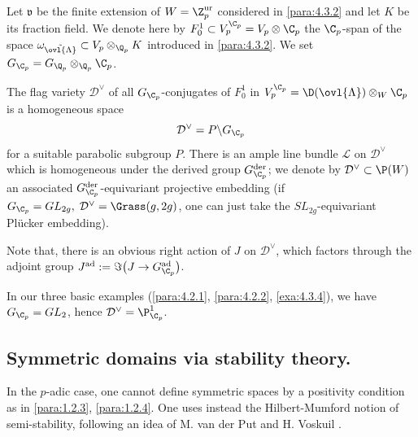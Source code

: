 \begin{para}\label{para:5.1.3} Let $\mathfrak{v}$ be the finite extension of
 $W={\Z_p^{\mathrm{ur}}}$ considered in \ref{para:4.3.2} and let $K$ be its 
 fraction field. We denote here by $F^1_0\subset V_p^{\C_p}=V_p\otimes
 \C_p$ the $\C_p$-span of the space
 $\omega_{\tilde{\ovl{\Lambda}}}\subset V_p\otimes_{\Q_p}K$ introduced in
 \ref{para:4.3.2}. We set $G_{\C_p}=G_{\Q_p}\otimes_{\Q_p}\C_p$.

 \noindent The flag variety $\mathcal{D}^\vee$ of all
 $G_{\C_p}$-conjugates of $F^1_0$ in $V_p^{\C_p}=\D(\ovl{\Lambda})
 \otimes_W\C_p$ is a homogeneous space 
 \begin{equation*}
  \mathcal{D}^\vee = P\backslash G_{\C_p}
 \end{equation*}
 for a suitable parabolic subgroup $P$. There is an
 ample line bundle $\mathcal{L}$ on $\mathcal{D}^\vee$
 which is homogeneous under the derived group $G_{\C_p}^{\mathrm{der}}$;
 we denote by $\mathcal{D}^\vee \subset \P(W)$ an 
 associated $G_{\C_p}^{\mathrm{der}}$-equivariant projective embedding (if
 $G_{\C_p}=GL_{2g},\;\mathcal{D}^{\vee} = \Grass(g,2g)$, one 
 can just take the $SL_{2g}$-equivariant Pl\"ucker embedding).

 Note that, there is an obvious right action of $J$ on
 $\mathcal{D}^{\vee}$, which factors through the adjoint group
 $J^{\mathrm{ad}}:=\Im\bigl(J\rightarrow G_{\C_p}^{\mathrm{ad}}\bigr)$. 
\end{para}

\begin{para}\label{para:5.1.4} In our three basic examples (\ref{para:4.2.1}, \ref{para:4.2.2}, \ref{exa:4.3.4}), we
have $G_{\C_p}=GL_2$, hence $\mathcal{D}^\vee=\P^1_{\C_p}$.    
\end{para}


\subsection{Symmetric domains via stability theory.}\label{sub:5.2}


\begin{para}\label{para:5.2.1} In the $p$-adic case, one cannot define symmetric spaces by a positivity condition as in \ref{para:1.2.3}, \ref{para:1.2.4}.
One uses instead the Hilbert-Mumford notion of semi-stability, following an idea of M. van der Put and H. Voskuil
\cite{ssatsagoalf}. 


\end{para}

